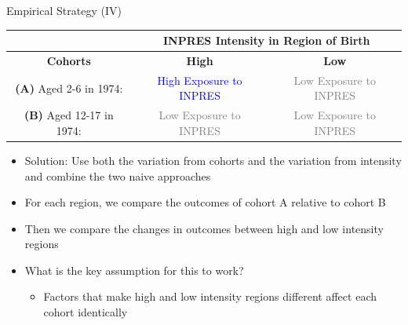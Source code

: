 \documentclass[11pt,notes=hide,aspectratio=169,mathserif]{beamer}
\begin{document}
\begin{frame}{Empirical Strategy (IV)}
\begin{table}
\scriptsize
\centering
\begin{tabular}{|c|c|c|}
\hline
    & \multicolumn{2}{|c|}{\textbf{INPRES Intensity in Region of Birth}}  \\
    \hline
    \textbf{Cohorts} & \textbf{High} & \textbf{Low}  \\
\hline 
\textbf{(A)} Aged 2-6 in 1974:  & \rule{0pt}{15pt}  \textcolor{blue}{High Exposure to INPRES} & \rule{0pt}{15pt} \textcolor{gray}{Low Exposure to INPRES} \\
\hline
\textbf{(B)} Aged 12-17 in 1974:  & \rule{0pt}{15pt} \textcolor{gray}{Low Exposure to INPRES} & \rule{0pt}{15pt} \textcolor{gray}{Low Exposure to INPRES} \\
\hline
\end{tabular}
\end{table}

\begin{itemize}
     \item  Solution: Use both the variation from cohorts and the variation from intensity and combine the two naive approaches
     \item  For each region, we compare the outcomes of cohort A relative to cohort B
     \item  Then we compare the changes in outcomes between high and low intensity regions
     \item  What is the key assumption for this to work?
     \begin{itemize}
        \item Factors that make high and low intensity regions different affect each cohort identically 
    \end{itemize} 
\end{itemize}
\end{frame}
\end{document}
